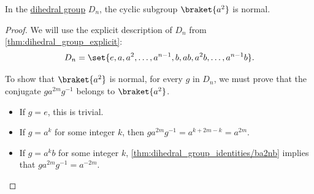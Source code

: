 \begin{corollary}\label{thm:dihedral_subgroup_a2}
  In the \hyperref[def:dihedral_group]{dihedral group} \( D_n \), the cyclic subgroup \( \braket{ a^2 } \) is normal.
\end{corollary}
\begin{proof}
  We will use the explicit description of \( D_n \) from \cref{thm:dihedral_group_explicit}:
  \begin{equation*}
    D_n = \set{ e, a, a^2, \ldots, a^{n-1}, b, ab, a^2b, \ldots, a^{n-1}b }.
  \end{equation*}

  To show that \( \braket{ a^2 } \) is normal, for every \( g \) in \( D_n \), we must prove that the conjugate \( g a^{2m} g^{-1} \) belongs to \( \braket{ a^2 } \).
  \begin{itemize}
    \item If \( g = e \), this is trivial.
    \item If \( g = a^k \) for some integer \( k \), then \( g a^{2m} g^{-1} = a^{k+2m-k} = a^{2m} \).
    \item If \( g = a^k b \) for some integer \( k \), \cref{thm:dihedral_group_identities/ba2nb} implies that \( g a^{2m} g^{-1} = a^{-2m} \).
  \end{itemize}
\end{proof}

